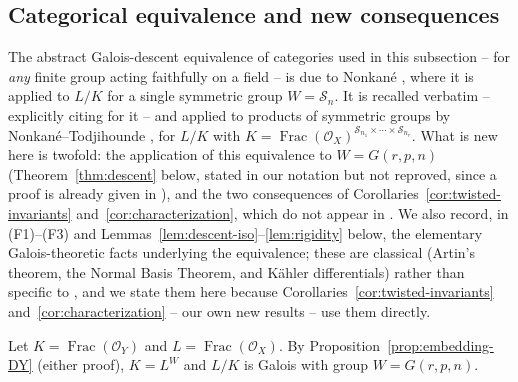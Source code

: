 \documentclass[11pt,a4paper]{article}
\begin{document}
\subsection{Categorical equivalence and new consequences}\label{subsec:galois-descent}

The abstract Galois-descent equivalence of categories used in this
subsection -- for \emph{any} finite group acting faithfully on a
field -- is due to
Nonkan\'e \cite[\S 2.4]{Nonkane2019}, where it is applied to $L/K$ for
a single symmetric group $W = \mathcal{S}_n$. It is recalled
verbatim -- explicitly citing \cite{Nonkane2019} for it -- and applied
to products of symmetric groups by
Nonkan\'e--Todjihounde \cite[Prop.\ 3.10]{NonkaneTodjihounde2023}, for
$L/K$ with $K = \operatorname{Frac}(\mathcal{O}_X)^{\mathcal{S}_{n_1}\times\cdots\times\mathcal{S}_{n_r}}$.
What is new here is twofold: the
application of this equivalence to $W = G(r,p,n)$ (Theorem~\ref{thm:descent}
below, stated in our notation but not reproved, since a proof is
already given in \cite{Nonkane2019}), and the two consequences of
Corollaries~\ref{cor:twisted-invariants} and~\ref{cor:characterization},
which do not appear in \cite{Nonkane2019,NonkaneTodjihounde2023}. We
also record, in (F1)--(F3) and Lemmas~\ref{lem:descent-iso}--\ref{lem:rigidity}
below, the elementary Galois-theoretic facts underlying the
equivalence; these are classical (Artin's theorem, the Normal Basis
Theorem, and Kähler differentials) rather than specific to
\cite{Nonkane2019,NonkaneTodjihounde2023}, and we state them here
because Corollaries~\ref{cor:twisted-invariants}
and~\ref{cor:characterization} -- our own new results -- use them
directly.

Let $K = \operatorname{Frac}(\mathcal{O}_Y)$ and
$L = \operatorname{Frac}(\mathcal{O}_X)$. By Proposition~\ref{prop:embedding-DY}
(either proof), $K = L^W$ and $L/K$ is Galois with group $W = G(r,p,n)$.
\end{document}
